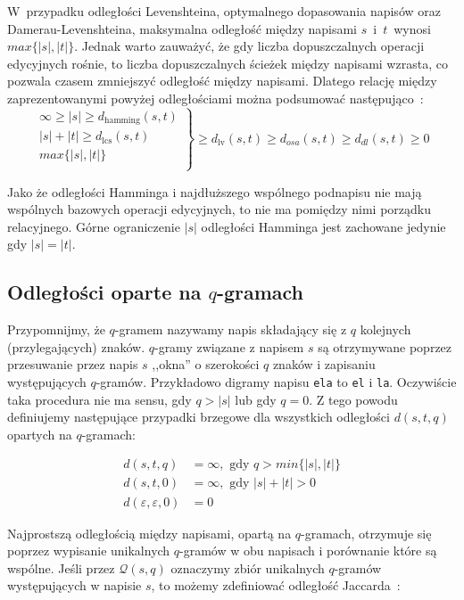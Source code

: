 \documentclass{praca1}
\begin{document}
W~przypadku odległości Levenshteina, optymalnego dopasowania napisów oraz Damerau-Levenshteina, maksymalna odległość między napisami $s$~i~$t$~wynosi $max\{|s|, |t|\}$. Jednak warto zauważyć, że gdy liczba dopuszczalnych operacji edycyjnych rośnie, to liczba dopuszczalnych ścieżek między napisami wzrasta, co pozwala czasem zmniejszyć odległość między napisami. Dlatego relację między zaprezentowanymi powyżej odległościami można podsumować następująco~\cite{Loo2014:stringdist}:
$$
\left. \begin{array}{r}
\infty \geq |s| \geq d_{\mathrm{hamming}}(s,t) \\
|s| + |t| \geq d_{\mathrm{lcs}}(s,t) \\
max\{|s|, |t|\} \\
\end{array} \right \}
\geq d_{\mathrm{lv}}(s,t) \geq d_{osa}(s,t) \geq d_{dl}(s,t) \geq 0
$$

Jako że odległości Hamminga i najdłuższego wspólnego podnapisu nie mają wspólnych bazowych operacji edycyjnych, to nie ma pomiędzy nimi porządku relacyjnego. Górne ograniczenie $|s|$ odległości Hamminga jest zachowane jedynie gdy $|s| = |t|$.







\subsection{Odległości oparte na $q$-gramach}

Przypomnijmy, że $q$-gramem nazywamy napis składający się z $q$ kolejnych (przylegających) znaków. $q$-gramy związane z napisem $s$ są otrzymywane poprzez przesuwanie przez napis $s$ ,,okna'' o szerokości $q$ znaków i zapisaniu występujących $q$-gramów. Przykładowo digramy napisu \verb|ela| to \verb|el| i \verb|la|. Oczywiście taka procedura nie ma sensu, gdy $q > |s|$ lub gdy $q = 0$. Z tego powodu definiujemy następujące przypadki brzegowe dla wszystkich odległości $d(s,t,q)$ opartych na $q$-gramach:

\begin{align*}
d(s,t,q) &= \infty, \text{ gdy } q > min\{|s|, |t|\}\\
d(s,t,0) &= \infty, \text{ gdy } |s| + |t| >0 \\
d(\varepsilon,\varepsilon,0) &= 0
\end{align*}

Najprostszą odległością między napisami, opartą na $q$-gramach, otrzymuje się poprzez wypisanie unikalnych $q$-gramów w obu napisach i porównanie które są wspólne. Jeśli przez $\mathcal{Q}(s,q)$ oznaczymy zbiór unikalnych $q$-gramów występujących w napisie $s$, to możemy zdefiniować odległość Jaccarda~\cite{Loo2014:stringdist}:
\end{document}
